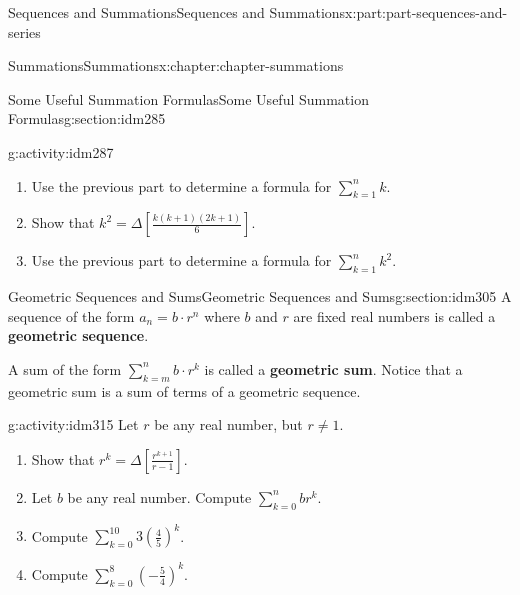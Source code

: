 \documentclass[oneside,10pt,]{book}
\newcommand{\terminology}[1]{\textbf{#1}}
\begin{document}
\begin{partptx}{Sequences and Summations}{}{Sequences and Summations}{}{}{x:part:part-sequences-and-series}
\begin{chapterptx}{Summations}{}{Summations}{}{}{x:chapter:chapter-summations}
\begin{sectionptx}{Some Useful Summation Formulas}{}{Some Useful Summation Formulas}{}{}{g:section:idm285}
\begin{activity}{}{g:activity:idm287}
\begin{enumerate}[font=\bfseries,label=(\alph*),ref=\alph*]
\item{}Use the previous part to determine a formula for \(\displaystyle\sum_{k=1}^n k\).%
\item{}Show that \(k^2 = \Delta \left[ \frac{k(k+1)(2k+1)}{6}\right]\).%
\item{}Use the previous part to determine a formula for \(\displaystyle\sum_{k=1}^n k^2\).%
\end{enumerate}
\end{activity}
\end{sectionptx}
%
%
\typeout{************************************************}
\typeout{************************************************}
%
\begin{sectionptx}{Geometric Sequences and Sums}{}{Geometric Sequences and Sums}{}{}{g:section:idm305}
A sequence of the form \(a_n = b\cdot r^n\) where \(b\) and \(r\) are fixed real numbers is called a \terminology{geometric sequence}.%
\par
A sum of the form \(\displaystyle\sum_{k=m}^n b\cdot r^k\) is called a \terminology{geometric sum}. Notice that a geometric sum is a sum of terms of a geometric sequence.%
\begin{activity}{}{g:activity:idm315}%
Let \(r\) be any real number, but \(r \neq 1\).%
\begin{enumerate}[font=\bfseries,label=(\alph*),ref=\alph*]
\item{}Show that \(\displaystyle r^k = \Delta \left[\frac{r^{k+1}}{r-1}\right]\).%
\item{}Let \(b\) be any real number. Compute \(\displaystyle\sum_{k=0}^n b r^k\).%
\item{}Compute \(\displaystyle\sum_{k=0}^{10} 3 \left(\frac{4}{5}\right)^k\).%
\item{}Compute \(\displaystyle\sum_{k=0}^8  \left(-\frac{5}{4}\right)^k\).%
\end{enumerate}
\end{activity}
\end{sectionptx}
\end{chapterptx}
\end{partptx}
%
%
\typeout{************************************************}
\typeout{************************************************}
%
\end{document}
